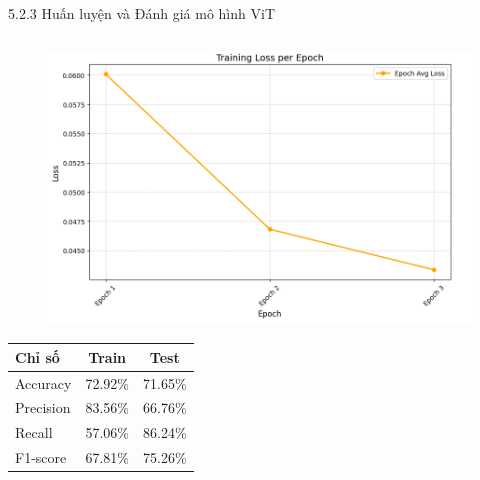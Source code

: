 \begin{frame}{5.2.3 Huấn luyện và Đánh giá mô hình ViT}
\begin{columns}
    \begin{column}{0.5\textwidth}
        \begin{figure}
            \centering
            \includegraphics[width=0.8\linewidth]{img/05-loss.png}
        \end{figure}
        \begin{center}
        \scriptsize
        \begin{tabular}{|l|c|c|}
            \hline
            \textbf{Chỉ số} & \textbf{Train} & \textbf{Test} \\
            \hline
            Accuracy  & 72.92\% & 71.65\% \\
            Precision & 83.56\% & 66.76\% \\
            Recall    & 57.06\% & 86.24\% \\
            F1-score  & 67.81\% & 75.26\% \\
            \hline
        \end{tabular}
        \end{center}
    \end{column}
\end{columns}
\end{frame}

